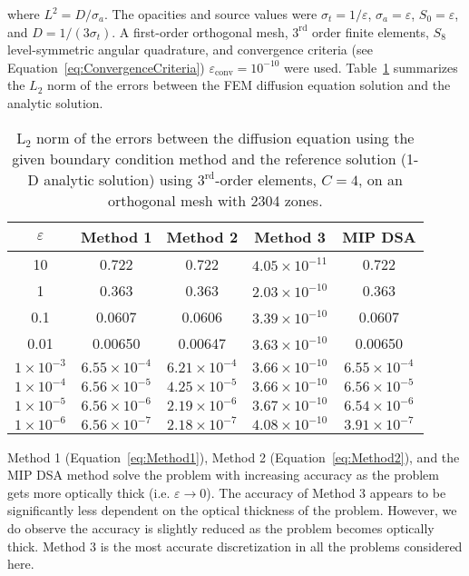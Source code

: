 \documentclass{article}
\begin{document}
\noindent where $L^2 = D/\sigma_a$. The opacities and source values were $\sigma_t = 1/\varepsilon$, $\sigma_a = \varepsilon$, $S_0 = \varepsilon$, and $D = 1/ \left(3 \sigma_t \right)$. A first-order orthogonal mesh, $3^\text{rd}$ order finite elements, $S_8$ level-symmetric angular quadrature, and convergence criteria (see Equation~\ref{eq:ConvergenceCriteria}) $\varepsilon_\text{conv} = 10^{-10}$ were used. Table~\ref{tab:1DDiffusionComparison} summarizes the $L_2$ norm of the errors between the FEM diffusion equation solution and the analytic solution.
%
\begin{table}[!h]
\centering
{\renewcommand{\arraystretch}{1.5}
\begin{tabular}{|c|c|c|c|c|}
\hline
$\varepsilon$ & Method 1 & Method 2 & Method 3 & MIP DSA \\\hline
10 & 0.722 & 0.722 & $4.05 \times 10^{-11}$ & 0.722 \\\hline
1 & 0.363 & 0.363 & $2.03 \times 10^{-10}$ & 0.363 \\\hline
0.1 & 0.0607 & 0.0606 & $3.39 \times 10^{-10}$ & 0.0607 \\\hline
0.01 & 0.00650 & 0.00647 & $3.63 \times 10^{-10}$ & 0.00650 \\\hline
$1 \times 10^{-3}$ & $6.55 \times 10^{-4}$ & $6.21 \times 10^{-4}$ & $3.66 \times 10^{-10}$ & $6.55 \times 10^{-4}$ \\\hline
$1 \times 10^{-4}$ & $6.56 \times 10^{-5}$ & $4.25 \times 10^{-5}$ & $3.66 \times 10^{-10}$ & $6.56 \times 10^{-5}$ \\\hline
$1 \times 10^{-5}$ & $6.56 \times 10^{-6}$ & $2.19 \times 10^{-6}$ & $3.67 \times 10^{-10}$ & $6.54 \times 10^{-6}$ \\\hline
$1 \times 10^{-6}$ & $6.56 \times 10^{-7}$ & $2.18 \times 10^{-7}$ & $4.08 \times 10^{-10}$ & $3.91 \times 10^{-7}$ \\\hline
\end{tabular}}
\caption{L$_2$ norm of the errors between the diffusion equation using the given boundary condition method and the reference solution (1-D analytic solution) using $3^\text{rd}$-order elements, $C=4$, on an orthogonal mesh with 2304 zones.}
\label{tab:1DDiffusionComparison}
\end{table}
%
Method 1 (Equation~\ref{eq:Method1}), Method 2 (Equation~\ref{eq:Method2}), and the MIP DSA method solve the problem with increasing accuracy as the problem gets more optically thick (i.e. $\varepsilon \rightarrow 0$). The accuracy of Method 3 appears to be significantly less dependent on the optical thickness of the problem. However, we do observe the accuracy is slightly reduced as the problem becomes optically thick. Method 3 is the most accurate discretization in all the problems considered here.
\end{document}
